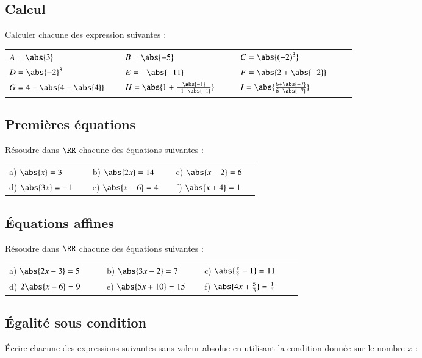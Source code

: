 \documentclass[oneside,12pt]{article}          %
\begin{document}
\subsection{Calcul}
Calculer chacune des expression suivantes :

\renewcommand{\arraystretch}{1.75}
\begin{tabular}{p{0.3\linewidth} p{0.3\linewidth} p{0.3\linewidth}}
	$A=\abs{3}$ & $B=\abs{-5}$ & $C=\abs{(-2)^3}$ \\
	$D=\abs{-2}^3$ & $E=-\abs{-11}$ & $F=\abs{2+\abs{-2}}$ \\
	$G=4-\abs{4-\abs{4}}$ & $H=\abs{1+\frac{\abs{-1}}{-1-\abs{-1}}}$ & $I=\abs{\frac{6+\abs{-7}}{6-\abs{-7}}}$
\end{tabular}



\subsection{Premières équations}
Résoudre dans $\RR$ chacune des équations suivantes :
\renewcommand{\arraystretch}{1.5}

\begin{tabular}{p{0.3\linewidth} p{0.3\linewidth} p{0.3\linewidth}}
	a) $\abs{x}=3$ & b) $\abs{2x}=14$ & c) $\abs{x-2}=6$ \\
	d) $\abs{3x}=-1$ & e) $\abs{x-6}=4$ & f) $\abs{x+4}=1$
\end{tabular}



\subsection{Équations affines}
Résoudre dans $\RR$ chacune des équations suivantes :

\begin{tabular}{p{0.3\linewidth} p{0.3\linewidth} p{0.3\linewidth}}
	a) $\abs{2x-3}=5$ & b) $\abs{3x-2}=7$ & c) $\abs{\frac{x}{2}-1}=11$ \\
	d) $2\abs{x-6}=9$ & e) $\abs{5x+10}=15$ & f) $\abs{4x+\frac{5}{3}}=\frac{1}{3}$
\end{tabular}



\subsection{Égalité sous condition}
Écrire chacune des expressions suivantes sans valeur absolue en utilisant la condition donnée sur le nombre $x$ :
\end{document}

